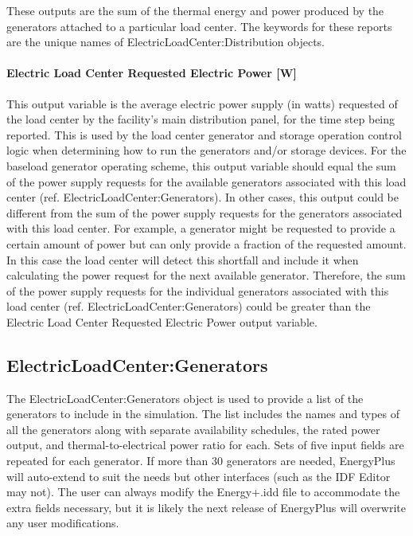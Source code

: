 These outputs are the sum of the thermal energy and power produced by the generators attached to a particular load center. The keywords for these reports are the unique names of ElectricLoadCenter:Distribution objects.

\paragraph{Electric Load Center Requested Electric Power {[}W{]}}\label{electric-load-center-requested-electric-power-w}

This output variable is the average electric power supply (in watts) requested of the load center by the facility's main distribution panel, for the time step being reported. This is used by the load center generator and storage operation control logic when determining how to run the generators and/or storage devices. For the baseload generator operating scheme, this output variable should equal the sum of the power supply requests for the available generators associated with this load center (ref. ElectricLoadCenter:Generators). In other cases, this output could be different from the sum of the power supply requests for the generators associated with this load center. For example, a generator might be requested to provide a certain amount of power but can only provide a fraction of the requested amount. In this case the load center will detect this shortfall and include it when calculating the power request for the next available generator. Therefore, the sum of the power supply requests for the individual generators associated with this load center (ref. ElectricLoadCenter:Generators) could be greater than the Electric Load Center Requested Electric Power output variable.

\subsection{ElectricLoadCenter:Generators}\label{electricloadcentergenerators}

The ElectricLoadCenter:Generators object is used to provide a list of the generators to include in the simulation. The list includes the names and types of all the generators along with separate availability schedules, the rated power output, and thermal-to-electrical power ratio for each. Sets of five input fields are repeated for each generator. If more than 30 generators are needed, EnergyPlus will auto-extend to suit the needs but other interfaces (such as the IDF Editor may not). The user can always modify the Energy+.idd file to accommodate the extra fields necessary, but it is likely the next release of EnergyPlus will overwrite any user modifications.

